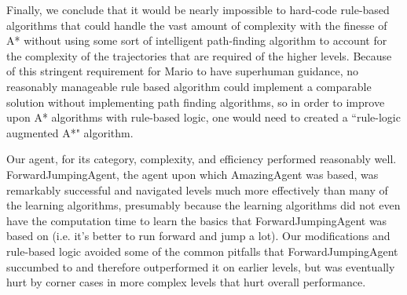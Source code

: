 \documentclass[12pt]{article}
\begin{document}
\begin{multicols*}{2}
Finally, we conclude that it would be nearly impossible to hard-code rule-based algorithms that could handle the vast amount of complexity with the finesse of 
A* without using some sort of intelligent path-finding algorithm to account for the complexity of the trajectories that are required of the higher levels. Because of
this stringent requirement for Mario to have superhuman guidance, no reasonably manageable rule based algorithm could implement a comparable solution without
implementing path finding algorithms, so in order to improve upon A* algorithms with rule-based logic, one would need to created a ``rule-logic augmented A*" algorithm.

Our agent, for its category, complexity, and efficiency performed reasonably well. ForwardJumpingAgent, the agent upon which AmazingAgent was based, was remarkably
successful and navigated levels much more effectively than many of the learning algorithms, presumably because the learning algorithms did not even have the computation 
time to learn the basics that ForwardJumpingAgent was based on (i.e. it's better to run forward and jump a lot). Our modifications and rule-based logic avoided some of the common
pitfalls that ForwardJumpingAgent succumbed to and therefore outperformed it on earlier levels, but was eventually hurt by corner cases in more complex levels that
hurt overall performance.

\end{multicols*}
\end{document}

